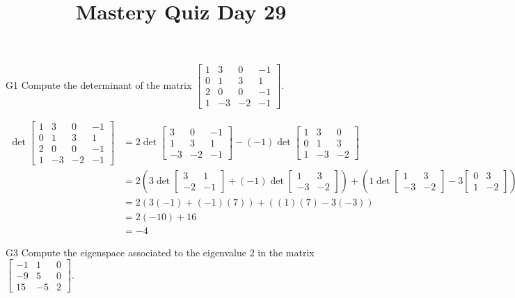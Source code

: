 \documentclass{sbgLAquiz}
\title{Mastery Quiz Day 29 }
\begin{document}
\begin{problem}{G1}
Compute the determinant of the matrix $\begin{bmatrix} 1 & 3 & 0 & -1 \\ 0 & 1 & 3 & 1 \\ 2 & 0 & 0 & -1 \\ 1 & -3 & -2 & -1 \end{bmatrix}$.
\end{problem}
\begin{solution}
\begin{align*}
\det \begin{bmatrix} 1 & 3 & 0 & -1 \\ 0 & 1 & 3 & 1 \\ 2 & 0 & 0 & -1 \\ 1 & -3 & -2 & -1 \end{bmatrix} &= 2 \det \begin{bmatrix} 3 & 0 & -1 \\ 1 & 3 & 1 \\ -3 & -2 & -1 \end{bmatrix} -(-1) \det \begin{bmatrix} 1 & 3 & 0 \\ 0 & 1 & 3 \\ 1 & -3 & -2 \end{bmatrix} \\
&=2\left( 3 \det \begin{bmatrix} 3 & 1 \\ -2 & -1 \end{bmatrix} + (-1) \det \begin{bmatrix} 1 & 3 \\ -3 & -2 \end{bmatrix}\right) + \left( 1 \det \begin{bmatrix} 1 & 3 \\ -3 & -2 \end{bmatrix} -3 \begin{bmatrix} 0 & 3 \\ 1 & -2 \end{bmatrix} \right) \\
&=2 \left( 3(-1)+(-1)(7) \right) + \left( (1)(7)-3(-3) \right) \\
&= 2(-10)+16 \\
&=-4
\end{align*}
\end{solution}


\begin{problem}{G3}
Compute the eigenspace associated to the eigenvalue $2$ in the matrix $\begin{bmatrix} -1 & 1 & 0 \\ -9 & 5 & 0 \\ 15 & -5 & 2 \end{bmatrix}$.
\end{problem}
\end{document}
